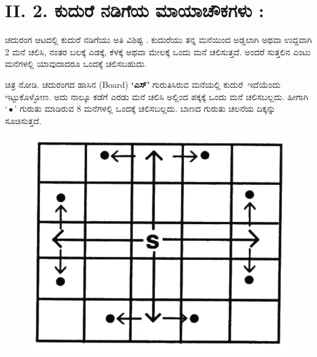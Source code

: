 \section*{II. 2. ಕುದುರೆ ನಡಿಗೆಯ ಮಾಯಾಚೌಕಗಳು :}

ಚದುರಂಗ ಆಟದಲ್ಲಿ ಕುದುರೆ ನಡಿಗೆಯು ಅತಿ ವಿಶಿಷ್ಟ . ಕುದುರೆಯು ತನ್ನ ಮನೆಯಿಂದ ಅಡ್ಡಲಾಗಿ ಅಥವಾ ಉದ್ದವಾಗಿ 2 ಮನೆ ಚಲಿಸಿ, ನಂತರ ಬಲಕ್ಕೆ ಎಡಕ್ಕೆ, ಕೆಳಕ್ಕೆ ಅಥವಾ ಮೇಲಕ್ಕೆ ಒಂದು ಮನೆ ಚಲಿಸುತ್ತದೆ. ಅಂದರೆ ಸುತ್ತಲಿನ ಎಂಟು ಮನೆಗಳಲ್ಲಿ ಯಾವುದಾದರೂ ಒಂದಕ್ಕೆ ಚಲಿಸಬಹುದು.

ಚಿತ್ರ ನೋಡಿ. ಚದುರಂಗದ ಹಾಸಿನ (Board) \textbf{‘ಎಸ್’} ಗುರುತಿಸಿರುವ ಮನೆಯಲ್ಲಿ \hbox{ಕುದುರೆ ಇದೆಯೆಂದು} ಇಟ್ಟುಕೊಳ್ಳೋಣ. ಅದು ನಾಲ್ಕೂ ಕಡೆಗೆ ಎರಡು ಮನೆ ಚಲಿಸಿ ಅಲ್ಲಿಂದ ಪಕ್ಕಕ್ಕೆ ಒಂದು ಮನೆ ಚಲಿಸಬಲ್ಲದು. ಹೀಗಾಗಿ $‘\bullet ’$ ಗುರುತು ಮಾಡಿರುವ 8 ಮನೆಗಳಲ್ಲಿ ಒಂದಕ್ಕೆ ಚಲಿಸಬಲ್ಲದು. ಬಾಣದ ಗುರುತು ಚಲನೆಯ ದಿಕ್ಕನ್ನು ಸೂಚಿಸುತ್ತದೆ.
\begin{figure}[H]
\includegraphics[scale=1.2]{src/figures/chap6/fig6-2.jpg}
\end{figure}

